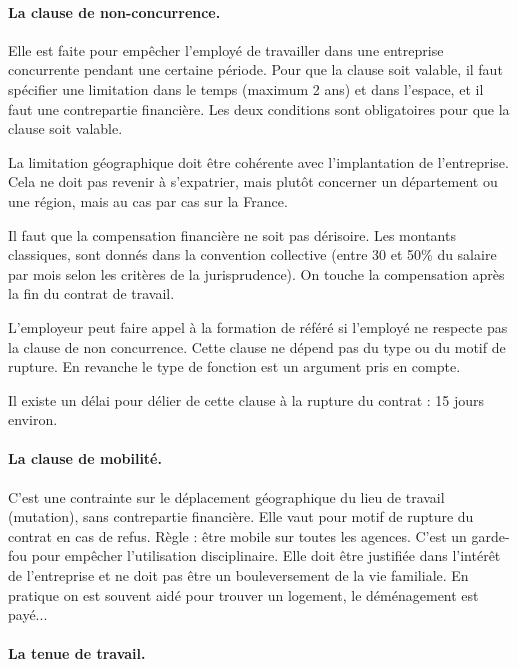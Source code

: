 	\paragraph{La clause de non-concurrence.}
	Elle est faite pour empêcher l’employé de travailler dans une entreprise concurrente pendant une certaine période.
	Pour que la clause soit valable, il faut spécifier une limitation dans le temps (maximum 2 ans) et dans l’espace, et il faut une contrepartie financière.
	Les deux conditions sont obligatoires pour que la clause soit valable.
	
	La limitation géographique doit être cohérente avec l'implantation de l'entreprise.
	Cela ne doit pas revenir à s'expatrier, mais plutôt concerner un département ou une région, mais au cas par cas sur la France.
	
	Il faut que la compensation financière ne soit pas dérisoire.
	Les montants classiques, sont donnés dans la convention collective (entre 30 et 50\% du salaire par mois selon les critères de la jurisprudence).
	On touche la compensation après la fin du contrat de travail.
	
	L’employeur peut faire appel à la formation de référé si l’employé ne respecte pas la clause de non concurrence.
	Cette clause ne dépend pas du type ou du motif de rupture.
	En revanche le type de fonction est un argument pris en compte.
	
	Il existe un délai pour délier de cette clause à la rupture du contrat : 15 jours environ.
	
	\paragraph{La clause de mobilité.}
	C'est une contrainte sur le déplacement géographique du lieu de travail (mutation), sans contrepartie financière.
	Elle vaut pour motif de rupture du contrat en cas de refus.
	Règle : être mobile sur toutes les agences.
	C'est un garde-fou pour empêcher l'utilisation disciplinaire.
	Elle doit être justifiée dans l'intérêt de l'entreprise et ne doit pas être un bouleversement de la vie familiale.
	En pratique on est souvent aidé pour trouver un logement, le déménagement est payé...
	
	\paragraph{La tenue de travail.}
	
